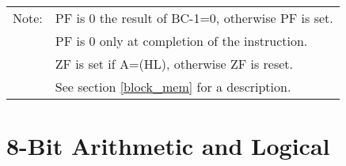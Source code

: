 \documentclass[oneside,a4paper]{book}
\newcommand{\notet}{\rule{0pt}{2.4ex}}
\newcommand{\noteb}{\rule[-1.3ex]{0pt}{0pt}}
\begin{document}
{\begin{tabular}{llcccccccccccccccl}
		\hline

		Note:
			& \multicolumn{17}{l}{\parbox{12cm}{\footnotemark[1]PF is 0 the result of BC-1=0, otherwise PF is set.}}\notet \\
			& \multicolumn{17}{l}{\parbox{12cm}{\footnotemark[2]PF is 0 only at completion of the instruction.}} \\
			& \multicolumn{17}{l}{\parbox{12cm}{\footnotemark[3]ZF is set if A=(HL), otherwise ZF is reset.}} \\
			& \multicolumn{17}{l}{\parbox{12cm}{\footnotemark[4]See section \ref{block_mem} for a description.}}\noteb \\
	  
	\hline

	\end{tabular}
}


\section{8-Bit Arithmetic and Logical}

\setlength{\textwidth}{18cm}
\end{document}
